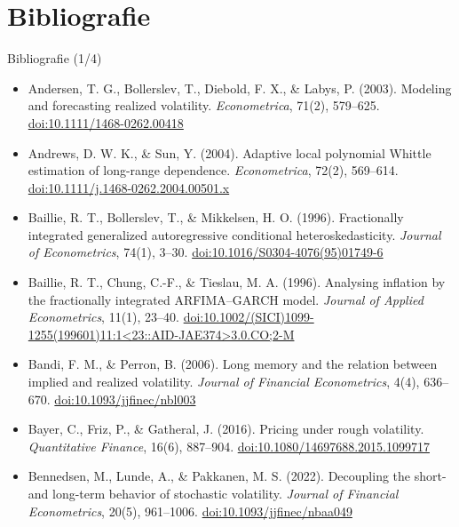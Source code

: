 \section{Bibliografie}

\begin{frame}{Bibliografie (1/4)}
\itemsize{\tiny}
\begin{itemize}
    \item Andersen, T. G., Bollerslev, T., Diebold, F. X., \& Labys, P. (2003). Modeling and forecasting realized volatility. \textit{Econometrica}, 71(2), 579--625. \href{https://doi.org/10.1111/1468-0262.00418}{doi:10.1111/1468-0262.00418}
    \item Andrews, D. W. K., \& Sun, Y. (2004). Adaptive local polynomial Whittle estimation of long-range dependence. \textit{Econometrica}, 72(2), 569--614. \href{https://doi.org/10.1111/j.1468-0262.2004.00501.x}{doi:10.1111/j.1468-0262.2004.00501.x}
    \item Baillie, R. T., Bollerslev, T., \& Mikkelsen, H. O. (1996). Fractionally integrated generalized autoregressive conditional heteroskedasticity. \textit{Journal of Econometrics}, 74(1), 3--30. \href{https://doi.org/10.1016/S0304-4076(95)01749-6}{doi:10.1016/S0304-4076(95)01749-6}
    \item Baillie, R. T., Chung, C.-F., \& Tieslau, M. A. (1996). Analysing inflation by the fractionally integrated ARFIMA--GARCH model. \textit{Journal of Applied Econometrics}, 11(1), 23--40. \href{https://doi.org/10.1002/(SICI)1099-1255(199601)11:1\%3C23::AID-JAE374\%3E3.0.CO;2-M}{doi:10.1002/(SICI)1099-1255(199601)11:1\textless{}23::AID-JAE374\textgreater{}3.0.CO;2-M}
    \item Bandi, F. M., \& Perron, B. (2006). Long memory and the relation between implied and realized volatility. \textit{Journal of Financial Econometrics}, 4(4), 636--670. \href{https://doi.org/10.1093/jjfinec/nbl003}{doi:10.1093/jjfinec/nbl003}
    \item Bayer, C., Friz, P., \& Gatheral, J. (2016). Pricing under rough volatility. \textit{Quantitative Finance}, 16(6), 887--904. \href{https://doi.org/10.1080/14697688.2015.1099717}{doi:10.1080/14697688.2015.1099717}
    \item Bennedsen, M., Lunde, A., \& Pakkanen, M. S. (2022). Decoupling the short- and long-term behavior of stochastic volatility. \textit{Journal of Financial Econometrics}, 20(5), 961--1006. \href{https://doi.org/10.1093/jjfinec/nbaa049}{doi:10.1093/jjfinec/nbaa049}

\end{itemize}
\end{frame}
